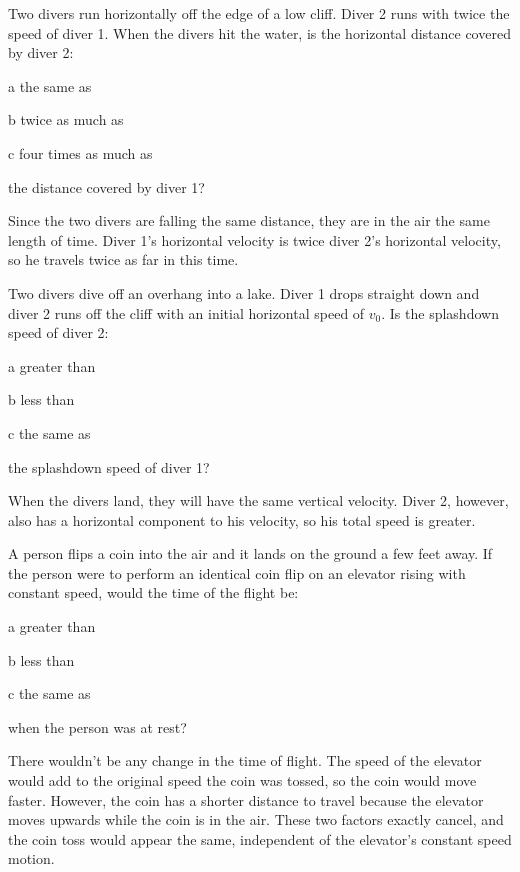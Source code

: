 \documentclass{exam}
\begin{document}
\begin{questions}

\question
Two divers run horizontally off the edge of a low cliff.  Diver 2 runs with twice the speed of diver 1.  When the 
divers hit the water, is the horizontal distance covered by diver 2:
\begin{description*}
  \item[a] the same as
  \item[b] twice as much as
  \item[c] four times as much as
\end{description*}
the distance covered by diver 1?

\begin{solution}
  Since the two divers are falling the same distance, they are in the air the same length of time.  Diver 1's horizontal
  velocity is twice diver 2's horizontal velocity, so he travels twice as far in this time.
\end{solution}

\question
Two divers dive off an overhang into a lake.  Diver 1 drops straight down and diver 2 runs off the cliff with an initial
horizontal speed of $v_0$.  Is the splashdown speed of diver 2:
\begin{description*}
  \item[a] greater than
  \item[b] less than
  \item[c] the same as
\end{description*}
the splashdown speed of diver 1?

\begin{solution}
When the divers land, they will have the same vertical velocity.  Diver 2, however, also has a horizontal component to
his velocity, so his total speed is greater.
\end{solution}

\question
A person flips a coin into the air and it lands on the ground a few feet away.  If the person were to perform an
identical coin flip on an elevator rising with constant speed, would the time of the flight be:
\begin{description*}
  \item[a] greater than
  \item[b] less than
  \item[c] the same as
\end{description*}
when the person was at rest?

\begin{solution}
There wouldn't be any change in the time of flight.  The speed of the elevator would add to the original speed the coin
was tossed, so the coin would move faster.  However, the coin has a shorter distance to travel because the elevator
moves upwards while the coin is in the air.  These two factors exactly cancel, and the coin toss would appear the same,
independent of the elevator's constant speed motion.


\end{solution}
\end{questions}
\end{document}
